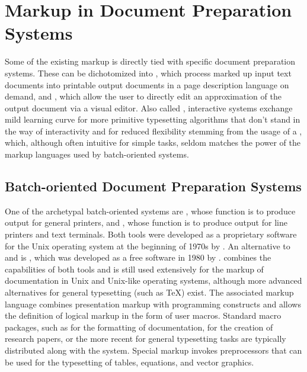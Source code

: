 \documentclass{book}
\begin{document}
\section{Markup in Document Preparation Systems}
Some of the existing markup is directly tied with specific document preparation
systems. These can be dichotomized into 
, which process marked up input
text documents into printable output documents in a page description language on
demand, and  , which allow the user to directly edit an approximation of
the output document via a visual editor. Also called ,
interactive systems exchange mild learning curve for more primitive typesetting
algorithms that don't stand in the way of interactivity and for reduced
flexibility stemming from the usage of a , which, although often
intuitive for simple tasks, seldom matches the power of the markup languages
used by batch-oriented systems.

\subsection{Batch-oriented Document Preparation Systems}
One of the archetypal batch-oriented systems are , whose
function is to produce output for general printers, and %
, whose function is to
produce output for line printers and text terminals. Both tools were developed
as a proprietary software for the Unix operating system at the beginning of
1970s by . An alternative to  and
 is
, which
was developed as a free software in 1980 by . 
combines the capabilities of both tools and is still used extensively for the
markup of documentation in Unix and Unix-like operating systems, although more
advanced alternatives for general typesetting (such as \TeX) exist. The
associated markup language combines presentation markup with programming
constructs and allows the definition of logical markup in the form of user
macros. Standard macro packages, such as  for the
formatting of documentation, 
 for the creation of research papers,
or the more recent  
for general typesetting tasks are typically distributed along with the system.
Special markup invokes preprocessors that can be used for the typesetting of
tables, equations, and vector graphics.
\end{document}

